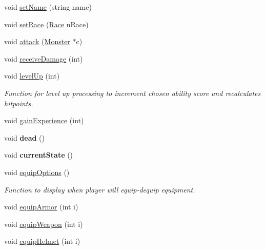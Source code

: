 \begin{DoxyCompactItemize}
\item 
void \hyperlink{class_fighter_af692d6c9b24f902c13bb8b7f3350631e}{set\+Name} (string name)
\item 
void \hyperlink{class_fighter_abd0aa443cda40a70c7df3bf1949a9e79}{set\+Race} (\hyperlink{_entity_8h_aa2df4028f474807638d438104900b003}{Race} n\+Race)
\item 
void \hyperlink{class_fighter_ac1a886e2f60333e38e90fff2a0f6107b}{attack} (\hyperlink{class_monster}{Monster} $\ast$c)
\item 
void \hyperlink{class_fighter_afe019dbd9ed0f0d10e047127dc478a63}{receive\+Damage} (int)
\item 
\hypertarget{class_fighter_a886a5fe6b7579951e64e68b76482b29c}{}\label{class_fighter_a886a5fe6b7579951e64e68b76482b29c} 
void \hyperlink{class_fighter_a886a5fe6b7579951e64e68b76482b29c}{level\+Up} (int)
\begin{DoxyCompactList}\small\item\em Function for level up processing to increment chosen ability score and recalculates hitpoints. \end{DoxyCompactList}\item 
void \hyperlink{class_fighter_af411947929c37ef0a0eab87b0c45f4f3}{gain\+Experience} (int)
\item 
\hypertarget{class_fighter_af690e4afec50a9c446120db47b463d84}{}\label{class_fighter_af690e4afec50a9c446120db47b463d84} 
void {\bfseries dead} ()
\item 
\hypertarget{class_fighter_ae888de59ae299553890387c58d774bda}{}\label{class_fighter_ae888de59ae299553890387c58d774bda} 
void {\bfseries current\+State} ()
\item 
\hypertarget{class_fighter_a60976eb2c11504befe0aff8522339636}{}\label{class_fighter_a60976eb2c11504befe0aff8522339636} 
void \hyperlink{class_fighter_a60976eb2c11504befe0aff8522339636}{equip\+Options} ()
\begin{DoxyCompactList}\small\item\em Function to display when player will equip-\/dequip equipment. \end{DoxyCompactList}\item 
void \hyperlink{class_fighter_acabd4955401ddf3ddc0be5f28fa64267}{equip\+Armor} (int i)
\item 
void \hyperlink{class_fighter_a4d88916d33514e2c7e5aaaef8916f93c}{equip\+Weapon} (int i)
\item 
void \hyperlink{class_fighter_ae90d7de8a4d6b61b35f43cefe7ec940c}{equip\+Helmet} (int i)
\item 

\end{DoxyCompactItemize}
